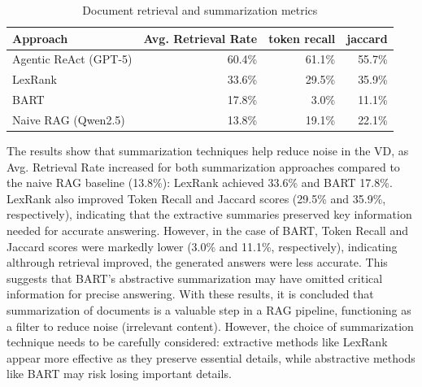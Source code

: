 \begin{table}[t]
\centering
\caption{Document retrieval and summarization metrics}
\label{tab:document_retrieved_metrics_summarization}
\begin{tabular}{lrrr}
\hline
Approach & Avg. Retrieval Rate & token recall & jaccard \\
\hline
Agentic ReAct (\gls{GPT}-5)& 60.4\% & 61.1\%  & 55.7\%\\
LexRank & 33.6\% & 29.5\%  & 35.9\% \\
BART & 17.8\% & 3.0\% & 11.1\% \\
Naive \gls{RAG} (Qwen2.5) & 13.8\% & 19.1\% & 22.1\% \\
\hline
\end{tabular}
\end{table}

The results show that summarization techniques help reduce noise in the \gls{VD}, as Avg. Retrieval Rate increased for both summarization approaches compared to the naive RAG baseline (13.8\%): LexRank achieved 33.6\% and BART 17.8\%.
LexRank also improved Token Recall and Jaccard scores (29.5\% and 35.9\%, respectively), indicating that the extractive summaries preserved key information needed for accurate answering.
However, in the case of BART, Token Recall and Jaccard scores were markedly lower (3.0\% and 11.1\%, respectively), indicating althrough retrieval improved, the generated answers were less accurate. This suggests that BART's abstractive summarization may have omitted critical information for precise answering.
With these results, it is concluded that summarization of documents is a valuable step in a \gls{RAG} pipeline, functioning as a filter to reduce noise (irrelevant content).
However, the choice of summarization technique needs to be carefully considered: extractive methods like LexRank appear more effective as they preserve essential details, while abstractive methods like BART may risk losing important details.


